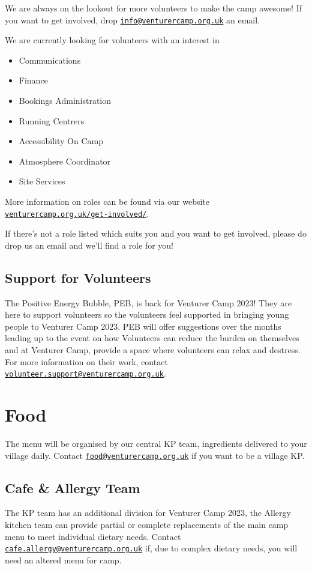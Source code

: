 \documentclass[a4paper, 10pt]{report}
\begin{document}
We are always on the lookout for more volunteers to make  the camp awesome! If you want to get involved, drop \href{mailto:info@venturercamp.org.uk}{\texttt{info@venturercamp.org.uk}} an email.

We are currently looking for volunteers with an interest in
\begin{itemize}
    \item Communications
    \item Finance
    \item Bookings Administration
    \item Running Centrers
    \item Accessibility On Camp
    \item Atmosphere Coordinator
    \item Site Services
\end{itemize}
More information on roles can be found via our website \href{https://venturercamp.org.uk/get-involved/}{\texttt{venturercamp.org.uk/get-involved/}}. 

If there's not a role listed which suits you and you want to get involved, please do drop us an email and we'll find a role for you! 

\section{Support for Volunteers}
The Positive Energy Bubble, PEB, is back for Venturer Camp 2023! They are here to support volunteers so the volunteers feel supported in bringing young people to Venturer Camp 2023. PEB will offer suggestions over the months leading up to the event on how Volunteers can reduce the burden on themselves and at Venturer Camp, provide a space where volunteers can relax and destress. For more information on their work, contact \href{mailto:volunteer.support@venturercamp.org.uk}{\texttt{volunteer.support@venturercamp.org.uk}}.

\chapter{Food}
The menu will be organised by our central KP team, ingredients delivered to your village daily. Contact \href{mailto:food@venturercamp.org.uk}{\texttt{food@venturercamp.org.uk}} if you want to be a village KP.
\section{Cafe \& Allergy Team}
The KP team has an additional division for Venturer Camp 2023, the Allergy kitchen team can provide partial or complete replacements of the main camp menu to meet individual dietary needs. Contact \href{mailto:cafe.allergy@venturercamp.org.uk}{\texttt{cafe.allergy@venturercamp.org.uk}} if, due to complex dietary needs, you will need an altered menu for camp. 
\end{document}
